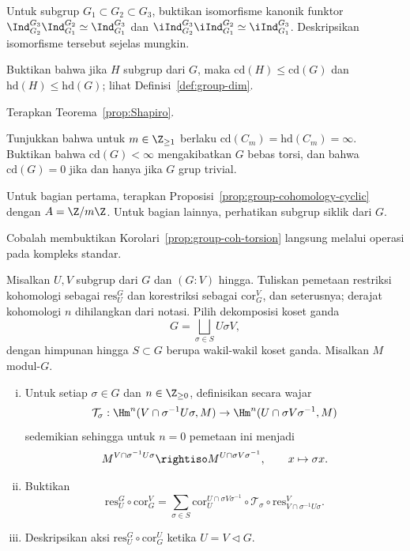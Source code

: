 \begin{Exercises}
	\item Untuk subgrup $G_1\subset G_2\subset G_3$, buktikan isomorfisme
	kanonik funktor
	$\Ind^{G_3}_{G_2}\Ind^{G_2}_{G_1}\simeq\Ind^{G_3}_{G_1}$ dan
	$\iInd^{G_3}_{G_2}\iInd^{G_2}_{G_1}\simeq\iInd^{G_3}_{G_1}$.
	Deskripsikan isomorfisme tersebut sejelas mungkin.

	\item Buktikan bahwa jika $H$ subgrup dari $G$, maka
	$\mathrm{cd}(H)\leq\mathrm{cd}(G)$ dan
	$\mathrm{hd}(H)\leq\mathrm{hd}(G)$; lihat Definisi~\ref{def:group-dim}.
	\begin{hint}
		Terapkan Teorema~\ref{prop:Shapiro}.
	\end{hint}

	\item Tunjukkan bahwa untuk $m\in\Z_{\geq1}$ berlaku
	$\mathrm{cd}(C_m)=\mathrm{hd}(C_m)=\infty$. Buktikan bahwa
	$\mathrm{cd}(G)<\infty$ mengakibatkan $G$ bebas torsi, dan bahwa
	$\mathrm{cd}(G)=0$ jika dan hanya jika $G$ grup trivial.
	\begin{hint}
		Untuk bagian pertama, terapkan
		Proposisi~\ref{prop:group-cohomology-cyclic} dengan $A=\Z/m\Z$.
		Untuk bagian lainnya, perhatikan subgrup siklik dari $G$.
	\end{hint}

	\item Cobalah membuktikan Korolari~\ref{prop:group-coh-torsion} langsung
	melalui operasi pada kompleks standar.

	\item Misalkan $U,V$ subgrup dari $G$ dan $(G:V)$ hingga. Tuliskan pemetaan
	restriksi kohomologi sebagai $\mathrm{res}^G_U$ dan korestriksi sebagai
	$\mathrm{cor}^V_G$, dan seterusnya; derajat kohomologi $n$ dihilangkan dari
	notasi. Pilih dekomposisi koset ganda
	\[ G=\bigsqcup_{\sigma\in S}U\sigma V, \]
	dengan himpunan hingga $S\subset G$ berupa wakil-wakil koset ganda. Misalkan
	$M$ modul-$G$.
	\begin{enumerate}[(i)]
		\item Untuk setiap $\sigma\in G$ dan $n\in\Z_{\geq0}$, definisikan
		secara wajar
		\[ \mathcal{T}_\sigma:
		\Hm^n(V\cap\sigma^{-1}U\sigma,M)
		\to\Hm^n(U\cap\sigma V\sigma^{-1},M) \]
		sedemikian sehingga untuk $n=0$ pemetaan ini menjadi
		\[ M^{V\cap\sigma^{-1}U\sigma}\rightiso
		M^{U\cap\sigma V\sigma^{-1}},\qquad x\mapsto\sigma x. \]
		\item Buktikan
		\[ \mathrm{res}^G_U\circ\mathrm{cor}^V_G
		=\sum_{\sigma\in S}
		\mathrm{cor}^{U\cap\sigma V\sigma^{-1}}_U
		\circ\mathcal{T}_\sigma
		\circ\mathrm{res}^V_{V\cap\sigma^{-1}U\sigma}. \]
		\item Deskripsikan aksi
		$\mathrm{res}^G_U\circ\mathrm{cor}^U_G$ ketika $U=V\lhd G$.
	\end{enumerate}


\end{Exercises}
